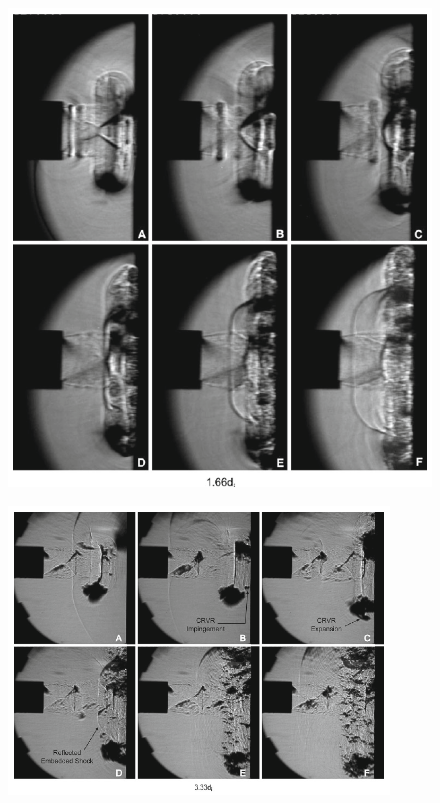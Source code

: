 \begin{figure}[H] 
	\centering
	\includegraphics[scale=1.1]{mariani1.PNG} 
	\caption{\cite{mariani2013a}}
\end{figure}

\begin{figure}[H] 
	\centering
	\includegraphics[width=0.9\textwidth]{mariani3.PNG} 
	\caption{\cite{mariani2013a}}
\end{figure}

